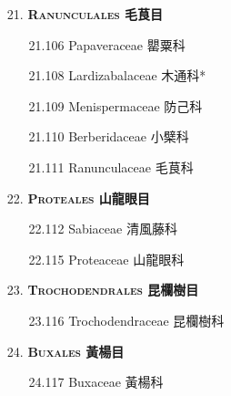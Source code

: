 \begin{enumerate}
  \item[21. ] \textbf{\textsc{Ranunculales} 毛茛目}   
    \begin{enumerate}
      \item[21.106] Papaveraceae 罌粟科     
        
      \item[21.108] Lardizabalaceae 木通科*    
        
      \item[21.109] Menispermaceae 防己科     
        
      \item[21.110] Berberidaceae 小檗科     
        
      \item[21.111] Ranunculaceae 毛茛科     
        
    \end{enumerate}
  \item[22. ] \textbf{\textsc{Proteales} 山龍眼目}   
    \begin{enumerate}
      \item[22.112] Sabiaceae 清風藤科     
        
      \item[22.115] Proteaceae 山龍眼科     
        
    \end{enumerate}
  \item[23. ] \textbf{\textsc{Trochodendrales} 昆欄樹目}   
    \begin{enumerate}
      \item[23.116] Trochodendraceae 昆欄樹科     
        
    \end{enumerate}
  \item[24. ] \textbf{\textsc{Buxales} 黃楊目}   
    \begin{enumerate}
      \item[24.117] Buxaceae 黃楊科     
        
    \end{enumerate}
\end{enumerate}
